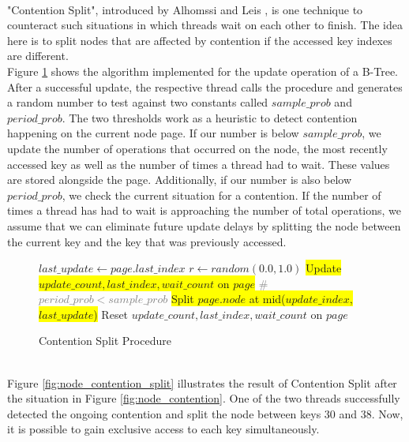 \documentclass[acmlarge,nonacm,dvipsnames]{acmart}
\begin{document}
\\"Contention Split", introduced by Alhomssi and Leis \cite{contention_space_management}, is one technique to counteract such situations in which threads wait on each other to finish. The idea here is to split nodes that are affected by contention if the accessed key indexes are different.\\
Figure \ref{fig:contention_split} shows the algorithm implemented for the update operation of a B-Tree. After a successful update, the respective thread calls the procedure and generates a random number to test against two constants called $sample\_prob$ and $period\_prob$. The two thresholds work as a heuristic to detect contention happening on the current node page. If our number is below $sample\_prob$, we update the number of operations that occurred on the node, the most recently accessed key as well as the number of times a thread had to wait. These values are stored alongside the page. Additionally, if our number is also below $period\_prob$, we check the current situation for a contention. If the number of times a thread has had to wait is approaching the number of total operations, we assume that we can eliminate future update delays by splitting the node between the current key and the key that was previously accessed.
\begin{figure}
\begin{minipage}{0.625\textwidth}
\begin{algorithmic}[1]
	\State $last\_update\leftarrow page.last\_index$
	\State $r\leftarrow random(0.0, 1.0)$
	\If{$\textcolor{red}{r < sample\_prob}$}
	\State \colorbox{yellow}{Update $update\_count, last\_index, wait\_count$ on $page$}
	\EndIf
	\If{$\textcolor{red}{r < period\_prob}$} \textcolor{gray}{{} \# $period\_prob < sample\_prob$}
	\State \colorbox{yellow}{Split $page.node$ at mid($update\_index$, $last\_update$)}
	\State Reset $update\_count, last\_index, wait\_count$ on $page$ 
	\EndIf
	\EndIf
	\EndProcedure
\end{algorithmic}
\end{minipage}
\caption{Contention Split Procedure}
\label{fig:contention_split}
\end{figure}
\\Figure \ref{fig:node_contention_split} illustrates the result of Contention Split after the situation in Figure \ref{fig:node_contention}. One of the two threads successfully detected the ongoing contention and split the node between keys 30 and 38. Now, it is possible to gain exclusive access to each key simultaneously.
\end{document}
